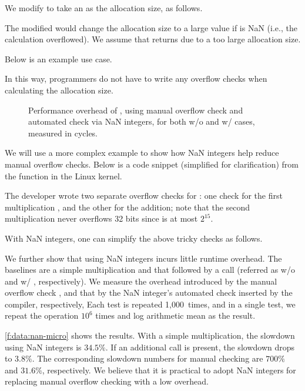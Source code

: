 We modify  to take an  as
the allocation size, as follows.

The modified  would change the allocation size to a large
value  if  is NaN (i.e., the calculation
overflowed).  We assume that  returns
 due to a too large allocation size.

Below is an example use case.

In this way, programmers do not have to write any overflow checks
when calculating the allocation size.

\begin{figure}
\centering

\caption{Performance overhead of ,
using manual overflow check  and
automated check via NaN integers, for both w/o and w/ 
cases, measured in cycles.}
\label{f:data:nan-micro}
\end{figure}

We will use a more complex example to show how NaN integers
help reduce manual overflow checks.
%
Below is a code snippet (simplified for clarification) from the
 function in the Linux kernel.
%

%
The developer wrote two separate overflow checks for
:
one check for the first multiplication , and
the other for the addition;
note that the second multiplication 
never overflows 32 bits since  is at most $2^{15}$.

With NaN integers, one can simplify the above tricky checks as
follows.


We further show that using NaN integers incurs little runtime
overhead.  The baselines are a simple multiplication  and
that followed by a  call (referred as w/o and w/
, respectively).  We measure the overhead introduced by
the manual overflow check , and
that by the NaN integer's automated check inserted by the compiler,
respectively,
%
Each test is repeated 1,000~times, and in a single test, we repeat
the operation $10^6$ times and log arithmetic mean as the result.

\autoref{f:data:nan-micro} shows the results.
%
With a simple multiplication, the slowdown using NaN integers is
$34.5\%$.  If an additional  call is present, the slowdown
drops to $3.8\%$.
%
The corresponding slowdown numbers for manual checking
are $700\%$ and $31.6\%$, respectively.
%
We believe that it is practical to adopt NaN integers for
replacing manual overflow checking with a low overhead.

